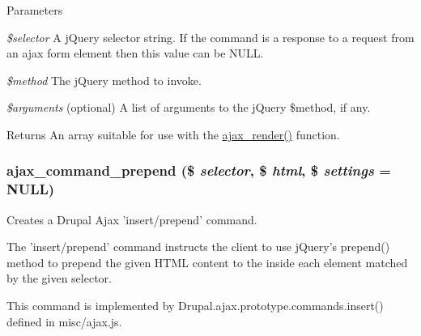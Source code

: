 \begin{DoxyParams}{Parameters}
\item[{\em \$selector}]A jQuery selector string. If the command is a response to a request from an ajax form element then this value can be NULL. \item[{\em \$method}]The jQuery method to invoke. \item[{\em \$arguments}](optional) A list of arguments to the jQuery \$method, if any.\end{DoxyParams}
\begin{DoxyReturn}{Returns}
An array suitable for use with the \hyperlink{group__ajax_ga241c2426bdde049c55b05b7bf5d714a2}{ajax\_\-render()} function. 
\end{DoxyReturn}
\hypertarget{group__ajax__commands_gaafaae3874d173618f88c0baa1fdab12b}{
\subsubsection[{ajax\_\-command\_\-prepend}]{\setlength{\rightskip}{0pt plus 5cm}ajax\_\-command\_\-prepend (\$ {\em selector}, \/  \$ {\em html}, \/  \$ {\em settings} = {\ttfamily NULL})}}
\label{group__ajax__commands_gaafaae3874d173618f88c0baa1fdab12b}
Creates a Drupal Ajax 'insert/prepend' command.

The 'insert/prepend' command instructs the client to use jQuery's prepend() method to prepend the given HTML content to the inside each element matched by the given selector.

This command is implemented by Drupal.ajax.prototype.commands.insert() defined in misc/ajax.js.


